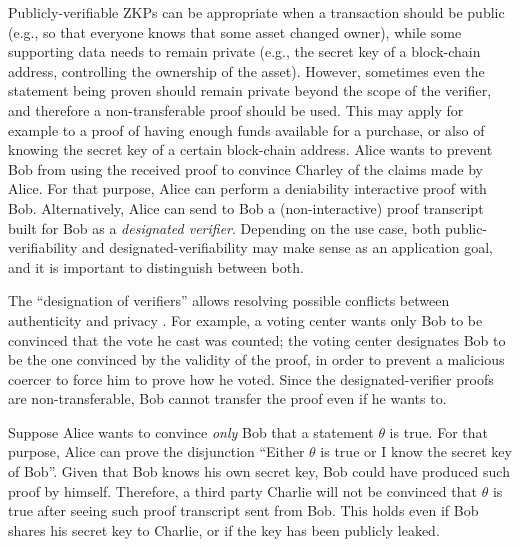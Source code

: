 	
	Publicly-verifiable ZKPs can be appropriate when a transaction should be public 
(e.g., so that everyone knows that some asset changed owner), while some supporting data needs to remain private 
(e.g., the secret key of a block-chain address, controlling the ownership of the asset).
	However, sometimes even the statement being proven should remain private beyond the scope of the verifier, and therefore a non-transferable proof	should be used.
	This may apply for example to a proof of having enough funds available for a purchase, or also of knowing the secret key of a certain block-chain address.
	Alice wants to prevent Bob from using the received proof to convince Charley of the claims made by Alice.
	For that purpose, Alice can perform a deniability interactive proof with Bob.
	Alternatively, Alice can send to Bob a (non-interactive) proof transcript built for Bob as a \emph{designated verifier}.
	Depending on the use case, both public-verifiability and designated-verifiability may make sense as an application goal, and it is important to distinguish between both.



	The ``designation of verifiers'' allows resolving possible conflicts between authenticity and privacy \cite{1996:eurocrypt:designated-verifier-proofs}.
	For example, a voting center wants only Bob to be convinced that the vote he cast was counted;
	the voting center designates Bob to be the one convinced by the validity of the proof, 
in order to prevent a malicious coercer to force him to prove how he voted.
	Since the designated-verifier proofs are non-transferable, Bob cannot transfer the proof even if he wants to.


	Suppose Alice wants to convince \emph{only} Bob that a statement $\theta$ is true.
	For that purpose, Alice can prove the disjunction ``Either $\theta$ is true or I know the secret key of Bob''.
	Given that Bob knows his own secret key, Bob could have produced such proof by himself.
	Therefore, a third party Charlie will not be convinced that $\theta$ is true after seeing such proof transcript sent from Bob.
	This holds even if Bob shares his secret key to Charlie, or if the key has been publicly leaked.

